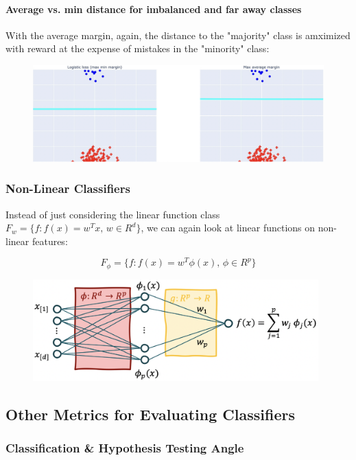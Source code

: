 \documentclass[a4paper]{extarticle}
\begin{document}
\paragraph{Average vs. min distance for imbalanced and far away classes} With the average margin, again, the distance to the "majority" class is amximized with reward at the expense of mistakes in the "minority" class:

\begin{figure}[H]
    \includegraphics[width=15cm]{../images/IntroML_Fig4-11}
    \centering
\end{figure}

\subsubsection{Non-Linear Classifiers}

Instead of just considering the linear function class \(F_w = \{f : f(x) = w^Tx, \, w \in R^d\}\), we can again look at linear functions on non-linear features:

\[
    F_{\phi} = \{f : f(x) = w^T\phi(x), \, \phi \in R^p\}
\]

\begin{figure}[H]
    \includegraphics[width=11cm]{../images/IntroML_Fig4-12}
    \centering
\end{figure}

\subsection{Other Metrics for Evaluating Classifiers}

\subsubsection{Classification \& Hypothesis Testing Angle}
\end{document}
